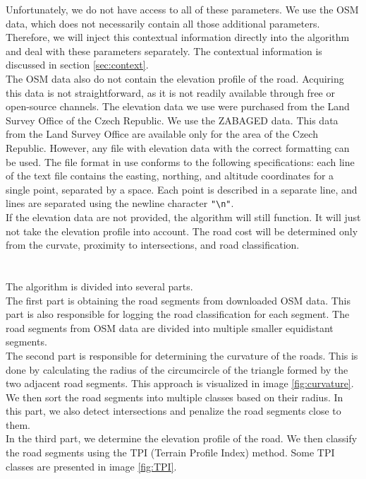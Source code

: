            Unfortunately, we do not have access to all of these parameters. We use the OSM data, which does not necessarily contain all those additional parameters. Therefore, we will inject this contextual information directly into the algorithm and deal with these parameters separately. The contextual information is discussed in section \ref{sec:context}.\\
            The OSM data also do not contain the elevation profile of the road. Acquiring this data is not straightforward, as it is not readily available through free or open-source channels. The elevation data we use were purchased from the Land Survey Office of the Czech Republic. We use the ZABAGED \cite{ZABAGED} data. This data from the Land Survey Office are available only for the area of the Czech Republic. However, any file with elevation data with the correct formatting can be used. The file format in use conforms to the following specifications: each line of the text file contains the easting, northing, and altitude coordinates for a single point, separated by a space. Each point is described in a separate line, and lines are separated using the newline character \texttt{"\textbackslash n"}.\\
            If the elevation data are not provided, the algorithm will still function. It will just not take the elevation profile into account. The road cost will be determined only from the curvate, proximity to intersections, and road classification.\\\\
        \\
            The algorithm is divided into several parts.\\
            The first part is obtaining the road segments from downloaded OSM data. This part is also responsible for logging the road classification for each segment. The road segments from OSM data are divided into multiple smaller equidistant segments.\\
            The second part is responsible for determining the curvature of the roads. This is done by calculating the radius of the circumcircle of the triangle formed by the two adjacent road segments. This approach is visualized in image \ref{fig:curvature}. We then sort the road segments into multiple classes based on their radius. In this part, we also detect intersections and penalize the road segments close to them.\\
            In the third part, we determine the elevation profile of the road. We then classify the road segments using the TPI (Terrain Profile Index) method. Some TPI classes are presented in image \ref{fig:TPI}.\\
